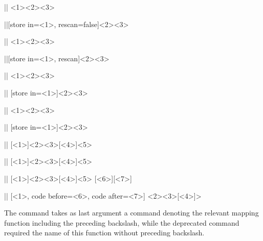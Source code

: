\documentclass[a4paper]{article}
\begin{document}
{{\begin{macrodeprecated}
|\JSONParseSetValue|
  {<1>}{<2>}{<3>}
\end{macrodeprecated}
\hfill
\begin{macroreplacement}
|\JSONParseValue|[store in={<1>},
  rescan=false]{<2>}{<3>}
\end{macroreplacement}

\begin{macrodeprecated}
|\JSONParseSetRescanValue|
  {<1>}{<2>}{<3>}
\end{macrodeprecated}
\hfill
\begin{macroreplacement}
|\JSONParseValue|[store in={<1>},
  rescan]{<2>}{<3>}
\end{macroreplacement}

\begin{macrodeprecated}
|\JSONParseSetKeys|
  {<1>}{<2>}{<3>}
\end{macrodeprecated}
\hfill
\begin{macroreplacement}
|\JSONParseKeys|
  [store in={<1>}]{<2>}{<3>}
\end{macroreplacement}

\begin{macrodeprecated}
|\JSONParseSetArrayCount|
  {<1>}{<2>}{<3>}
\end{macrodeprecated}
\hfill
\begin{macroreplacement}
|\JSONParseArrayCount|
  [store in={<1>}]{<2>}{<3>}
\end{macroreplacement}

\begin{macrodeprecated}
|\JSONParseArrayValues|
  [<1>]{<2>}{<3>}[<4>]{<5>}
\end{macrodeprecated}
\hfill
\begin{macroreplacement}
|\JSONParseArrayUse|
  [<1>]{<2>}{<3>}[<4>]{<5>}
\end{macroreplacement}

\begin{macrodeprecated}
|\JSONParseArrayValuesMap|
  [<1>]{<2>}{<3>}[<4>]{<5>}
  [<6>][<7>]
\end{macrodeprecated}
\hfill
\begin{macroreplacement}
|\JSONParseArrayMapFunction|
  [<1>, code before={<6>},
    code after={<7>}]
  {<2>}{<3>}[<4>]{>}
\end{macroreplacement}

The command \macro{\JSONParseArrayMapFunction} takes as last argument a command denoting the relevant mapping function including the preceding backslash, while the deprecated command \macro{\JSONParseArrayValuesMap} required the name of this function without preceding backslash.

}}
\end{document}
